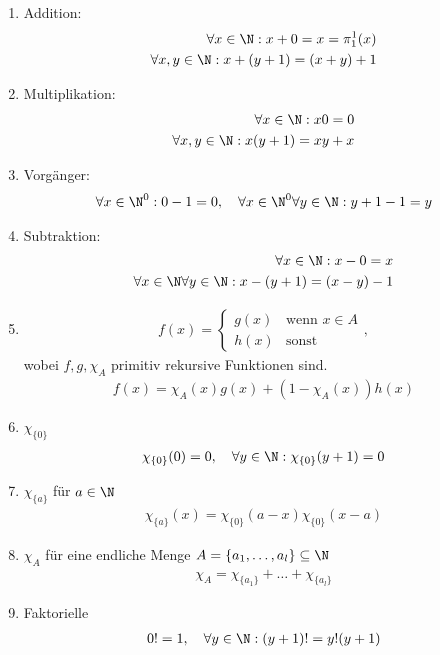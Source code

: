 
\begin{solution}
	\phantom{}
	\begin{enumerate}
		\item Addition: 
			\begin{align*}
			\forall x \in \N : x + 0 = x = \pi_1^1(x) \\
			\forall x, y \in \N : x + (y + 1) = (x + y) + 1
			\end{align*}
		\item Multiplikation:
			\begin{align*}
			\forall x \in \N : x0 = 0 \\
			\forall x,y \in \N: x(y+ 1) = xy + x
			\end{align*}
		\item Vorgänger:
			\begin{align*}
			 \forall x \in \N^0: 0 - 1 = 0, \quad \forall x \in \N^0 \forall y \in \N:  y + 1 - 1 = y
			\end{align*}
		\item Subtraktion:
			\begin{align*}
			\forall x \in \N: x - 0 = x \\
			\forall x \in \N \forall y \in \N: x - (y + 1) = (x - y) - 1
			\end{align*}
		\item 
			\begin{align*}
			f(x) = \begin{cases}
			g(x) & \text{wenn } x \in A \\
			h(x) & \text{sonst}
			\end{cases},
			\end{align*}
			wobei $f,g, \chi_A$ primitiv rekursive Funktionen sind.
			\begin{align*}
			f(x) = \chi_A(x) g(x) + (1 - \chi_A(x)) h(x)
			\end{align*}
		\item $\chi_{\{0\}}$
			\begin{align*}
			\chi_{\{0\}}(0) = 0, \quad \forall y \in \N: \chi_{\{0\}}(y + 1) = 0 
			\end{align*}
		\item $\chi_{\{a\}}$ für $a \in \N$
			\begin{align*}
			\chi_{\{a\}}(x) = \chi_{\{0\}}(a - x) \chi_{\{0\}}(x - a)
			\end{align*}
		\item $\chi_A$ für eine endliche Menge $A = \{a_1, \dots, a_l\} \subseteq \N$
			\begin{align*}
			\chi_A = \chi_{\{a_1\}} + \dots + \chi_{\{a_l\}}
			\end{align*}
		\item Faktorielle
			\begin{align*}
			0! = 1, \quad \forall y \in \N: (y + 1)! = y! (y + 1)
			\end{align*}
	\end{enumerate}

\end{solution}
